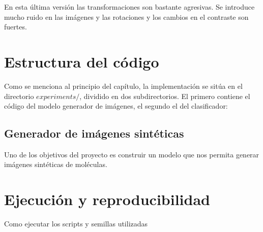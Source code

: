 En esta última versión las transformaciones son bastante agresivas. Se introduce mucho ruido en las imágenes y las rotaciones y los cambios en el contraste son fuertes.

\section{Estructura del código}
Como se menciona al principio del capítulo, la implementación se sitúa en el directorio $experiments/$, dividido en dos subdirectorios. El primero contiene el código del modelo generador de imágenes, el segundo el del clasificador: \\


\subsection{Generador de imágenes sintéticas}
Uno de los objetivos del proyecto es construir un modelo que nos permita generar imágenes sintéticas de moléculas. 

\section{Ejecución y reproducibilidad}
Como ejecutar los scripts y semillas utilizadas